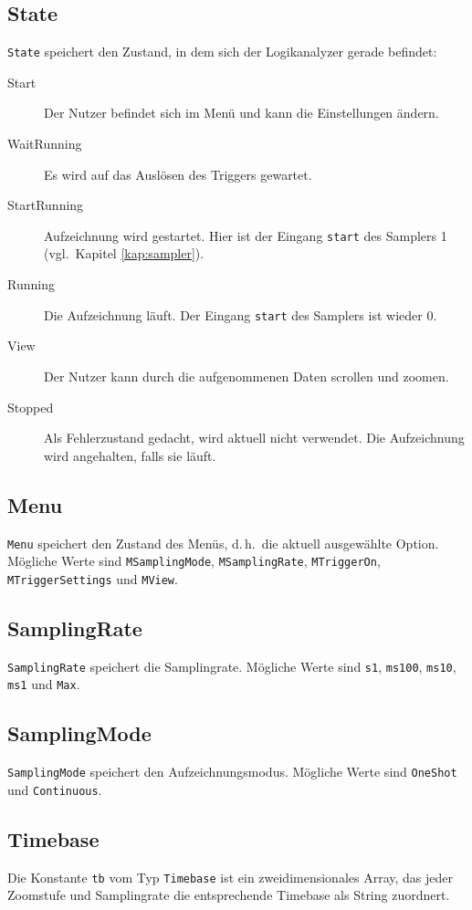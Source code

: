 \documentclass[IN,ngerman,utf8,12pt]{tumbook}
\newcommand{\dah}{d.\,h.\ }
\newcommand{\vgl}{vgl.\ }
\begin{document}
\subsection{State}
\label{kap:state}
\texttt{State} speichert den Zustand, in dem sich der Logikanalyzer gerade befindet:
\begin{description}
    \item[Start] Der Nutzer befindet sich im Menü und kann die Einstellungen ändern.
    \item[WaitRunning] Es wird auf das Auslösen des Triggers gewartet.
    \item[StartRunning] Aufzeichnung wird gestartet.
        Hier ist der Eingang \texttt{start} des Samplers 1 (\vgl Kapitel \ref{kap:sampler}).
    \item[Running] Die Aufzeichnung läuft. Der Eingang \texttt{start} des Samplers ist wieder 0.
    \item[View] Der Nutzer kann durch die aufgenommenen Daten scrollen und zoomen.
    \item[Stopped] Als Fehlerzustand gedacht, wird aktuell nicht verwendet.
        Die Aufzeichnung wird angehalten, falls sie läuft.
\end{description}

\subsection{Menu}
\label{kap:menu}
\texttt{Menu} speichert den Zustand des Menüs, \dah die aktuell ausgewählte Option.
Mögliche Werte sind \texttt{MSamplingMode}, \texttt{MSamplingRate}, \texttt{MTriggerOn}, \texttt{MTriggerSettings} und \texttt{MView}.

\subsection{SamplingRate}
\label{kap:samplingrate}
\texttt{SamplingRate} speichert die Samplingrate.
Mögliche Werte sind \texttt{s1}, \texttt{ms100}, \texttt{ms10}, \texttt{ms1} und \texttt{Max}.

\subsection{SamplingMode}
\label{kap:samplingmode}
\texttt{SamplingMode} speichert den Aufzeichnungsmodus.
Mögliche Werte sind \texttt{OneShot} und \texttt{Continuous}.

\subsection{Timebase}
\label{kap:timebase}
Die Konstante \texttt{tb} vom Typ \texttt{Timebase} ist ein zweidimensionales Array, das jeder Zoomstufe und Samplingrate die entsprechende Timebase als String zuordnert.
\end{document}
